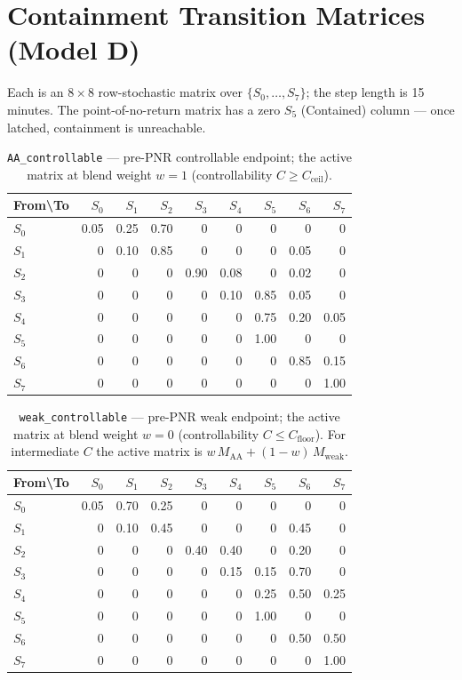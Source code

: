\documentclass[11pt,a4paper]{article}
\begin{document}
\section{Containment Transition Matrices (Model D)}
\label{app:transitions}

\noindent Each is an $8\times8$ row-stochastic matrix over
$\{S_0,\dots,S_7\}$; the step length is 15 minutes. The point-of-no-return
matrix has a zero $S_5$ (Contained) column --- once latched, containment is
unreachable.

\begin{table}[H]
\centering
\caption{\texttt{AA\_controllable} --- pre-PNR controllable endpoint; the active
matrix at blend weight $w=1$ (controllability $C \ge C_{\text{ceil}}$).}
\begin{tabular}{lrrrrrrrr}
\toprule
From\textbackslash To & $S_0$ & $S_1$ & $S_2$ & $S_3$ & $S_4$ & $S_5$ & $S_6$ & $S_7$ \\
\midrule
$S_0$ & 0.05 & 0.25 & 0.70 & 0 & 0 & 0 & 0 & 0 \\
$S_1$ & 0 & 0.10 & 0.85 & 0 & 0 & 0 & 0.05 & 0 \\
$S_2$ & 0 & 0 & 0 & 0.90 & 0.08 & 0 & 0.02 & 0 \\
$S_3$ & 0 & 0 & 0 & 0 & 0.10 & 0.85 & 0.05 & 0 \\
$S_4$ & 0 & 0 & 0 & 0 & 0 & 0.75 & 0.20 & 0.05 \\
$S_5$ & 0 & 0 & 0 & 0 & 0 & 1.00 & 0 & 0 \\
$S_6$ & 0 & 0 & 0 & 0 & 0 & 0 & 0.85 & 0.15 \\
$S_7$ & 0 & 0 & 0 & 0 & 0 & 0 & 0 & 1.00 \\
\bottomrule
\end{tabular}
\end{table}

\begin{table}[H]
\centering
\caption{\texttt{weak\_controllable} --- pre-PNR weak endpoint; the active matrix
at blend weight $w=0$ (controllability $C \le C_{\text{floor}}$). For intermediate
$C$ the active matrix is $w\,M_{\text{AA}} + (1-w)\,M_{\text{weak}}$.}
\begin{tabular}{lrrrrrrrr}
\toprule
From\textbackslash To & $S_0$ & $S_1$ & $S_2$ & $S_3$ & $S_4$ & $S_5$ & $S_6$ & $S_7$ \\
\midrule
$S_0$ & 0.05 & 0.70 & 0.25 & 0 & 0 & 0 & 0 & 0 \\
$S_1$ & 0 & 0.10 & 0.45 & 0 & 0 & 0 & 0.45 & 0 \\
$S_2$ & 0 & 0 & 0 & 0.40 & 0.40 & 0 & 0.20 & 0 \\
$S_3$ & 0 & 0 & 0 & 0 & 0.15 & 0.15 & 0.70 & 0 \\
$S_4$ & 0 & 0 & 0 & 0 & 0 & 0.25 & 0.50 & 0.25 \\
$S_5$ & 0 & 0 & 0 & 0 & 0 & 1.00 & 0 & 0 \\
$S_6$ & 0 & 0 & 0 & 0 & 0 & 0 & 0.50 & 0.50 \\
$S_7$ & 0 & 0 & 0 & 0 & 0 & 0 & 0 & 1.00 \\
\bottomrule
\end{tabular}
\end{table}
\end{document}
